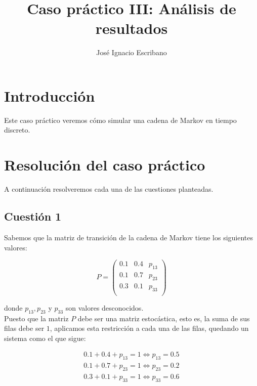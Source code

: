 \documentclass[12pt,a4paper,twoside,openright,titlepage,final]{article}
\author{José Ignacio Escribano}
\title{Caso práctico III: Análisis de resultados}
\begin{document}
\setcounter{page}{1}


\listoftables
\thispagestyle{empty}
\newpage

\listoffigures
\thispagestyle{empty}
\newpage

\tableofcontents
\thispagestyle{empty}
\newpage


\setcounter{page}{1}

\section{Introducción}

Este caso práctico veremos cómo simular una cadena de Markov en tiempo discreto.

\section{Resolución del caso práctico}

A continuación resolveremos cada una de las cuestiones planteadas.

\subsection{Cuestión 1}

Sabemos que la matriz de transición de la cadena de Markov tiene los siguientes valores:

\[ P = \left( \begin{array}{ccc}
0.1 & 0.4 & p_{13} \\
0.1 & 0.7 & p_{23} \\
0.3 & 0.1 & p_{33} \\
\end{array} \right) \]

donde $p_{13}, p_{23}$ y $p_{33}$ son valores desconocidos.\\

Puesto que la matriz $P$ debe ser una matriz estocástica, esto es, la suma de sus filas debe ser $1$, aplicamos esta restricción a cada una de las filas, quedando un sistema como el que sigue:

\[ \begin{array}{c}
0.1 + 0.4 + p_{13} = 1 \iff p_{13} = 0.5 \\
0.1 + 0.7 + p_{23} = 1 \iff p_{23} = 0.2 \\
0.3 + 0.1 + p_{33} = 1 \iff p_{33} = 0.6
\end{array} \]
\end{document}
